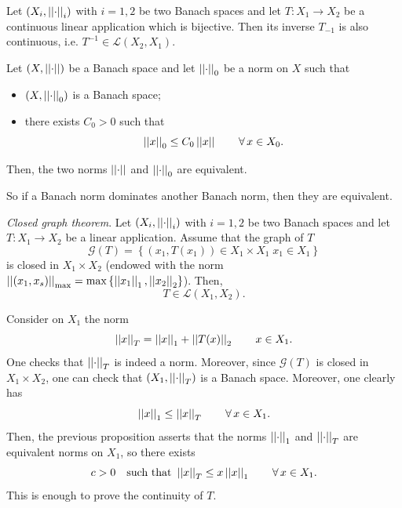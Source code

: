 \documentclass{article}
\begin{document}
\begin{corollary}
	Let $\left(X_{i},\left|\left|\cdot\right|\right|_{i}\right)$ with $i=1,2$ be two Banach spaces and let $T:X_{1}\to X_{2}$ be a continuous linear application which is bijective. Then its inverse $T_{-1}$ is also continuous, i.e. $T^{-1}\in\mathscr{L}(X_{2},X_{1})$.
\end{corollary}
\begin{proposition}
	Let $\left(X,\left|\left|\cdot\right|\right|\right)$ be a Banach space and let $\left|\left|\cdot\right|\right|_{0}$ be a norm on $X$ such that
	\begin{itemize}
		\item $\left(X,\left|\left|\cdot\right|\right|_{0}\right)$ is a Banach space;
		\item there exists $C_{0}>0$ such that
		\begin{equation*}
			\left|\left|x\right|\right|_{0}\leq C_{0}\left|\left|x\right|\right|\qquad\forall\, x\in X_{0}.
		\end{equation*}
	\end{itemize}
	Then, the two norms $\left|\left|\cdot\right|\right|$ and $\left|\left|\cdot\right|\right|_{0}$ are equivalent.
	\end{proposition}
So if a Banach norm dominates another Banach norm, then they are equivalent.
\begin{theorem}
	\emph{Closed graph theorem}. Let $\left(X_{i},\left|\left|\cdot\right|\right|_{i}\right)$ with $i=1,2$ be two Banach spaces and let $T:X_{1}\to X_{2}$ be a linear application. Assume that the graph of $T$
	\begin{equation*}
		\mathcal{G}(T)=\left\{(x_{1},T(x_{1}))\in X_{1}\times X_{1}\; x_{1}\in X_{1}\right\}
	\end{equation*}
	is closed in $X_{1}\times X_{2}$ (endowed with the norm $\left|\left|(x_{1},x_{s})\right|\right|_{\max}=\max\left\{\left|\left|x_{1}\right|\right|_{1},\left|\left|x_{2}\right|\right|_{2}\right\}$). Then, 
	\begin{equation*}
		T\in\mathscr{L}(X_{1},X_{2}).
	\end{equation*}
\end{theorem}
\begin{fancyproof}
	Consider on $X_{1}$ the norm
	\begin{equation*}
		\left|\left|x\right|\right|_{T}=\left|\left|x\right|\right|_{1}+\left|\left|T(x)\right|\right|_{2}\qquad x\in X_{1}.
	\end{equation*}
	One checks that $\left|\left|\cdot\right|\right|_{T}$ is indeed a norm. Moreover, since $\mathcal{G}(T)$ is closed in $X_{1}\times X_{2}$, one can check that $(X_{1},\left|\left|\cdot\right|\right|_{T})$ is a Banach space. Moreover, one clearly has 
	\begin{equation*}
		\left|\left|x\right|\right|_{1}\leq\left|\left|x\right|\right|_{T}\qquad\forall\, x\in X_{1}.
	\end{equation*}
	Then, the previous proposition asserts that the norms $\left|\left|\cdot\right|\right|_{1}$ and $\left|\left|\cdot\right|\right|_{T}$ are equivalent norms on $X_{1}$, so there exists
	\begin{equation*}
		c>0\quad\text{such that }\left|\left|x\right|\right|_{T}\leq x\left|\left|x\right|\right|_{1}\qquad\forall\, x\in X_{1}.
	\end{equation*}
	This is enough to prove the continuity of $T$.
\end{fancyproof}
\end{document}
